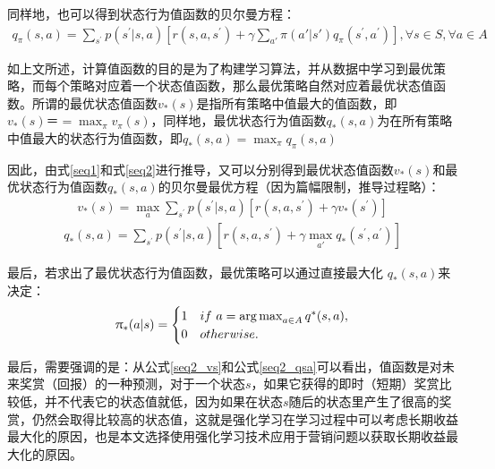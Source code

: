 同样地，也可以得到状态行为值函数的贝尔曼方程：
\begin{equation}
\label{seq2}
\begin{aligned}
q_{\pi}(s,a)=\sum_{s^{'}}p(s^{'}|s,a)[r(s,a,s^{'})+ \gamma \sum_{a'}\pi(a'|s') q_{\pi}(s^{'},a^{'})], \forall s \in S, \forall a \in A
\end{aligned}
\end{equation}

如上文所述，计算值函数的目的是为了构建学习算法，并从数据中学习到最优策略，而每个策略对应着一个状态值函数，那么最优策略自然对应着最优状态值函数。所谓的最优状态值函数$v_{*}(s)$是指所有策略中值最大的值函数，即$v_{*}(s)＝=\max_{\pi}v_{\pi}(s)$，同样地，最优状态行为值函数$q_{*}(s,a)$为在所有策略中值最大的状态行为值函数，即$q_{*}(s,a)=\max_{\pi}q_{\pi}(s,a)$

因此，由式\eqref{seq1}和式\eqref{seq2}进行推导，又可以分别得到最优状态值函数$v_{*}(s)$和最优状态行为值函数$q_{*}(s,a)$的贝尔曼最优方程（因为篇幅限制，推导过程略）：
\begin{equation}
\begin{aligned}
v_{*}(s)=\max_{a}\sum_{s^{'}}p(s^{'}|s,a)[r(s,a,s^{'})+\gamma v_{*}(s^{'})]
\end{aligned}
\end{equation}
\begin{equation}
\begin{aligned}
q_{*}(s,a)=\sum_{s^{'}}p(s^{'}|s,a)[r(s,a,s^{'}) +\gamma \max_{a'} q_{*}(s^{'},a^{'})]
\end{aligned}
\end{equation}

最后，若求出了最优状态行为值函数，最优策略可以通过直接最大化 $q_{*}(s,a)$来决定：
\begin{equation}
\begin{aligned}
\uppi_{*}(a|s) = 
    \begin{cases}
        1 & if \ a=\operatorname*{arg\,max}_{a\in A}{q^{*}(s,a)},\\
        0 & otherwise.
    \end{cases}
\end{aligned}
\end{equation}

最后，需要强调的是：从公式\eqref{seq2_vs}和公式\eqref{seq2_qsa}可以看出，值函数是对未来奖赏（回报）的一种预测，对于一个状态$s$，如果它获得的即时（短期）奖赏比较低，并不代表它的状态值就低，因为如果在状态$s$随后的状态里产生了很高的奖赏，仍然会取得比较高的状态值，这就是强化学习在学习过程中可以考虑长期收益最大化的原因，也是本文选择使用强化学习技术应用于营销问题以获取长期收益最大化的原因。

